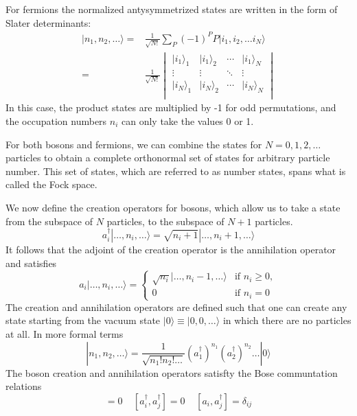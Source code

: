\documentclass[oneside,11pt]{memoir}
\begin{document}
For fermions the normalized antysymmetrized states are written in the form of
Slater determinants: \begin{equation}
\begin{split}
  | n_{1},  n_{2}, \ldots \rangle = &
  \frac{1}{\sqrt{N!}} \sum_{P} (- 1)^{P} P | i_{1},  i_{2}, \ldots i_{N} \rangle \\
  = &
  \frac{1}{\sqrt{N!}}
  \begin{vmatrix}
  |i_{1}\rangle_{1} & |i_{1}\rangle_{2} & \dotsm & |i_{1}\rangle_{N} \\
  \vdots &  \vdots &  \ddots   & \vdots \\
  |i_{N}\rangle_{1} & |i_{N}\rangle_{2} & \dotsm & |i_{N}\rangle_{N} \\
\end{vmatrix}
\end{split} 
  \label{eq:antisymmetrize} 
\end{equation}  
In this case, the product states are multiplied by -1 for odd permutations, and
the occupation numbers $n_{i}$ can only take the values 0 or 1. 

For both bosons and fermions, we can combine the states for $N=0,1,2,\ldots$
particles to obtain a complete orthonormal set of states for arbitrary particle
number.  This set of states, which are referred to as number states, spans what
is called the Fock space.   

We now define the creation  operators for bosons, which allow us to take a
state from the subspace of $N$ particles, to the subspace of $N+1$  particles.
\begin{equation}
 a_{i}^{\dagger} | \ldots, n_{i}, \ldots \rangle  = 
 \sqrt{n_{i}+1}|\ldots, n_{i}+1, \dots\rangle
\end{equation}
It follows that the adjoint of the creation operator is the annihilation
operator and satisfies 
\begin{equation}
a_{i} | \ldots, n_{i}, \ldots \rangle  
=\begin{cases}
\sqrt{n_{i}}|\ldots, n_{i}-1, \dots\rangle
& \text{if $n_{i}\geq 0$},\\
0 & \text{if $n_{i}=0$}
\end{cases}
\end{equation}
The creation and annihilation operators are defined such that one can create
any state starting from the vacuum state $|0\rangle \equiv |0,0,\ldots\rangle$
in which there are no particles at all.  In more formal terms 
\begin{equation}
  | n_{1}, n_{2}, \dots \rangle = \frac{1}{\sqrt{n_{1}!n_{2}!\ldots}} 
   ( a_{1}^{\dagger} ) ^{n_{1}}  
   ( a_{2}^{\dagger} ) ^{n_{2}}  \ldots | 0 \rangle
  \label{eq:numberstate}
\end{equation}
The boson creation and annihilation operators satisfty the Bose communtation
relations 
\begin{equation}
  [a_{i}, a_{j}] = 0 \ \ \ \ \  
  [a_{i}^{\dagger}, a_{j}^{\dagger}] = 0 \ \ \ \ \   
  [a_{i},a_{j}^{\dagger}]=\delta_{ij}
\end{equation}
\end{document}
